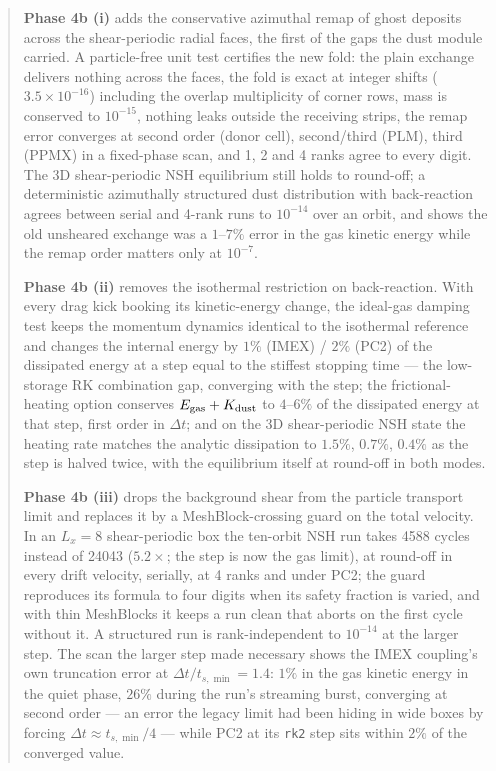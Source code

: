 \documentclass[11pt]{article}
\newcommand{\code}[1]{\texttt{#1}}
\begin{document}
\begin{abstract}
\textbf{Phase 4b (i)} adds the conservative azimuthal remap of ghost deposits across the
shear-periodic radial faces, the first of the gaps the dust module carried. A
particle-free unit test certifies the new fold: the plain exchange delivers nothing
across the faces, the fold is exact at integer shifts ($3.5\times10^{-16}$) including the
overlap multiplicity of corner rows, mass is conserved to $10^{-15}$, nothing leaks
outside the receiving strips, the remap error converges at second order (donor cell),
second/third (PLM), third (PPMX) in a fixed-phase scan, and 1, 2 and 4 ranks agree to
every digit. The 3D shear-periodic NSH equilibrium still holds to round-off; a
deterministic azimuthally structured dust distribution with back-reaction agrees
between serial and 4-rank runs to $10^{-14}$ over an orbit, and shows the old unsheared
exchange was a $1$--$7\%$ error in the gas kinetic energy while the remap order matters
only at $10^{-7}$.

\textbf{Phase 4b (ii)} removes the isothermal restriction on back-reaction. With every
drag kick booking its kinetic-energy change, the ideal-gas damping test keeps the
momentum dynamics identical to the isothermal reference and changes the internal
energy by $1\%$ (IMEX) / $2\%$ (PC2) of the dissipated energy at a step equal to the
stiffest stopping time --- the low-storage RK combination gap, converging with the
step; the frictional-heating option conserves $E_{\rm gas} + K_{\rm dust}$ to $4$--$6\%$
of the dissipated energy at that step, first order in $\Delta t$; and on the 3D
shear-periodic NSH state the heating rate matches the analytic dissipation to $1.5\%$,
$0.7\%$, $0.4\%$ as the step is halved twice, with the equilibrium itself at round-off
in both modes.

\textbf{Phase 4b (iii)} drops the background shear from the particle transport limit
and replaces it by a MeshBlock-crossing guard on the total velocity. In an $L_x = 8$
shear-periodic box the ten-orbit NSH run takes 4588 cycles instead of 24043
($5.2\times$; the step is now the gas limit), at round-off in every drift velocity,
serially, at 4 ranks and under PC2; the guard reproduces its formula to four digits
when its safety fraction is varied, and with thin MeshBlocks it keeps a run clean that
aborts on the first cycle without it. A structured run is rank-independent to
$10^{-14}$ at the larger step. The scan the larger step made necessary shows the IMEX
coupling's own truncation error at $\Delta t/t_{s,\min} = 1.4$: $1\%$ in the gas
kinetic energy in the quiet phase, $26\%$ during the run's streaming burst, converging
at second order --- an error the legacy limit had been hiding in wide boxes by forcing
$\Delta t \approx t_{s,\min}/4$ --- while PC2 at its \code{rk2} step sits within $2\%$
of the converged value.


\end{abstract}
\end{document}

